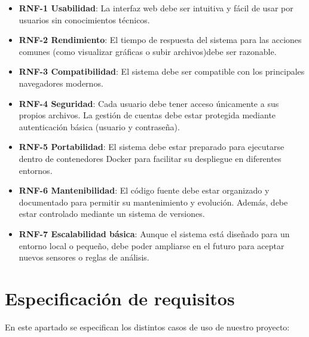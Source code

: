 \begin{itemize}
    \item \textbf{RNF-1 Usabilidad}: La interfaz web debe ser intuitiva y fácil de usar por usuarios sin conocimientos técnicos.

    \item \textbf{RNF-2 Rendimiento}: El tiempo de respuesta del sistema para las acciones comunes (como visualizar gráficas o subir archivos)debe ser razonable.

    \item \textbf{RNF-3 Compatibilidad}: El sistema debe ser compatible con los principales navegadores modernos.

    \item \textbf{RNF-4 Seguridad}: Cada usuario debe tener acceso únicamente a sus propios archivos. La gestión de cuentas debe estar protegida mediante autenticación básica (usuario y contraseña).

    \item \textbf{RNF-5 Portabilidad}: El sistema debe estar preparado para ejecutarse dentro de contenedores Docker para facilitar su despliegue en diferentes entornos.

    \item \textbf{RNF-6 Mantenibilidad}: El código fuente debe estar organizado y documentado para permitir su mantenimiento y evolución. Además, debe estar controlado mediante un sistema de versiones.

    \item \textbf{RNF-7 Escalabilidad básica}: Aunque el sistema está diseñado para un entorno local o pequeño, debe poder ampliarse en el futuro para aceptar nuevos sensores o reglas de análisis.

\end{itemize}

\section{Especificación de requisitos}
En este apartado se especifican los distintos casos de uso de nuestro proyecto:

